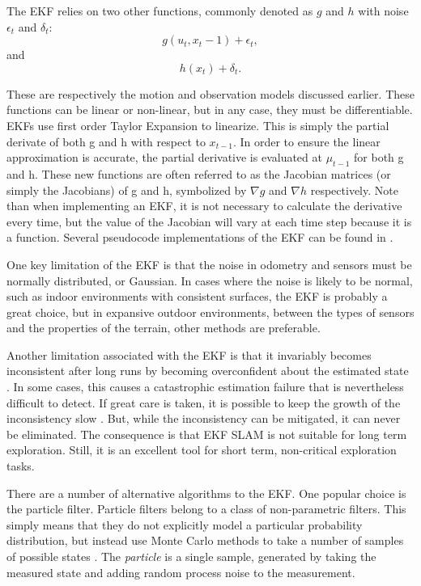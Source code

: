 The EKF relies on two other functions, commonly denoted as $g$ and $h$ with noise $\epsilon_t$ and $\delta_t$:
\begin{equation}\label{g}
g(u_t, x_t-1)+\epsilon_t, 
\end{equation}
and 
\begin{equation}\label{h}
h(x_t)+\delta_t.
\end{equation} 

These are respectively the motion and observation models discussed earlier.  These functions can be linear or non-linear, but in any case, they must be differentiable.  EKFs use first order Taylor Expansion to linearize.  This is simply the partial derivate of both g and h with respect to $x_{t-1}$.  In order to ensure the linear approximation is accurate, the partial derivative is evaluated at $\mu_{t-1}$ for both g and h.  These new functions are often referred to as the Jacobian matrices (or simply the Jacobians) of g and h, symbolized by $\nabla g$ and $\nabla h$ respectively.  Note than when implementing an EKF, it is not necessary to calculate the derivative every time, but the value of the Jacobian will vary at each time step because it is a function.  Several pseudocode implementations of the EKF can be found in \cite{ThrunPR2005}.

One key limitation of the EKF is that the noise in odometry and sensors must be normally distributed, or Gaussian.  In cases where the noise is likely to be normal, such as indoor environments with consistent surfaces, the EKF is probably a great choice, but in expansive outdoor environments, between the types of sensors and the properties of the terrain, other methods are preferable.  

Another limitation associated with the EKF is that it invariably becomes inconsistent after long runs by becoming overconfident about the estimated state \cite{Julier01acounter}.  In some cases, this causes a catastrophic estimation failure that is nevertheless difficult to detect.  If great care is taken, it is possible to keep the growth of the inconsistency slow \cite{BaileyNGSN06}.  But, while the inconsistency can be mitigated, it can never be eliminated.  The consequence is that EKF SLAM is not suitable for long term exploration.  Still, it is an excellent tool for short term, non-critical exploration tasks.

There are a number of alternative algorithms to the EKF.  One popular choice is the particle filter.  Particle filters belong to a class of non-parametric filters.  This simply means that they do not explicitly model a particular probability distribution, but instead use Monte Carlo methods to take a number of samples of possible states \cite{Thrun02d}.   The \emph{particle} is a single sample, generated by taking the measured state and adding random process noise to the measurement.  

